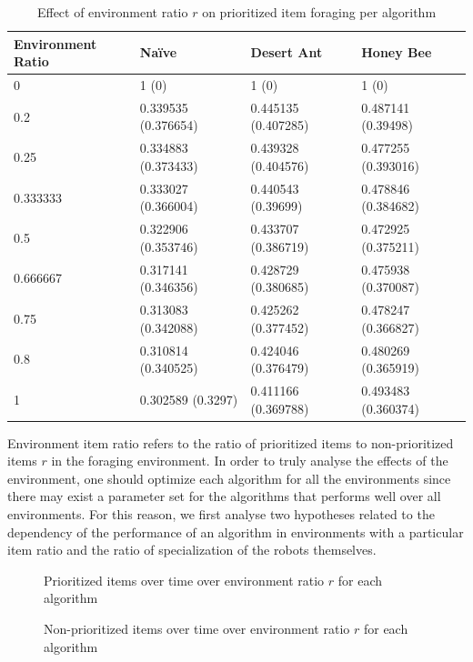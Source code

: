 \begin{table} [h]
    \caption{Effect of environment ratio $r$ on prioritized item foraging per algorithm}
    \label{generalratio}
	\centering
	\footnotesize
	\begin{tabular} {|l|l|l|l|}
		\hline
		Environment Ratio & Na\"ive & Desert Ant & Honey Bee \\
		\hline
		0 & 1 (0)  & 1 (0)  & 1 (0)  \\
		0.2 & 0.339535 (0.376654)  & 0.445135 (0.407285)  & 0.487141 (0.39498)  \\
		0.25 & 0.334883 (0.373433)  & 0.439328 (0.404576)  & 0.477255 (0.393016)  \\
		0.333333 & 0.333027 (0.366004)  & 0.440543 (0.39699)  & 0.478846 (0.384682)  \\
		0.5 & 0.322906 (0.353746)  & 0.433707 (0.386719)  & 0.472925 (0.375211)  \\
		0.666667 & 0.317141 (0.346356)  & 0.428729 (0.380685)  & 0.475938 (0.370087)  \\
		0.75 & 0.313083 (0.342088)  & 0.425262 (0.377452)  & 0.478247 (0.366827)  \\
		0.8 & 0.310814 (0.340525)  & 0.424046 (0.376479)  & 0.480269 (0.365919)  \\
		1 & 0.302589 (0.3297)  & 0.411166 (0.369788)  & 0.493483 (0.360374)  \\
		\hline
	\end{tabular}
\end{table}

Environment item ratio refers to the ratio of prioritized items to non-prioritized items $r$ in the foraging environment. In order to truly analyse the effects of the environment, one should optimize each algorithm for all the environments since there may exist a parameter set for the algorithms that performs well over all environments. For this reason, we first analyse two hypotheses related to the dependency of the performance of an algorithm in environments with a particular item ratio and the ratio of specialization of the robots themselves.

\begin{figure}[!htb]
\centering
\resizebox{\textwidth}{!}{}
\caption{Prioritized items over time over environment ratio $r$ for each algorithm }
\label{ratiogoldplot}
\end{figure}


\begin{figure}[!htb]
\centering
\resizebox{\textwidth}{!}{}
\caption{Non-prioritized items over time over environment ratio $r$ for each algorithm}
\label{ratiowasteplot}
\end{figure}

